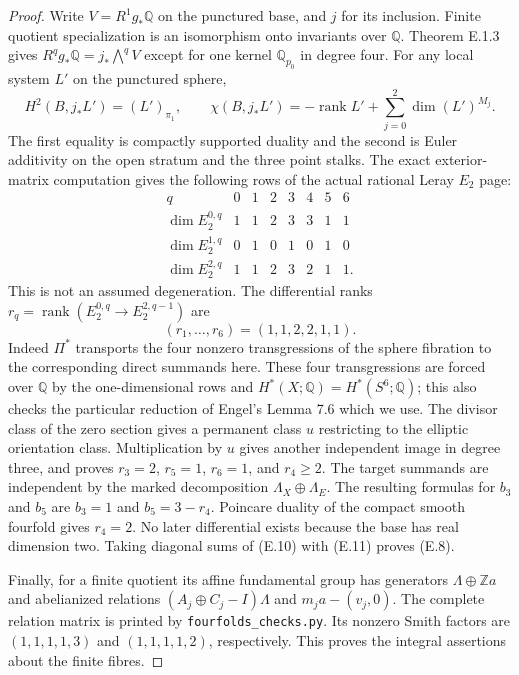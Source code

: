\begin{proof}
Write $V=R^1g_*\mathbb Q$ on the punctured base, and $j$ for its
inclusion.  Finite quotient specialization is an isomorphism onto
invariants over $\mathbb Q$.  Theorem E.1.3 gives
$R^qg_*\mathbb Q=j_*\bigwedge^qV$ except for one kernel
$\mathbb Q_{p_0}$ in degree four.  For any local system $L'$ on
the punctured sphere,
\[
 H^2(B,j_*L')=(L')_{\pi_1},\qquad
 \chi(B,j_*L')=-\operatorname{rank}L'+
       \sum_{j=0}^2\dim (L')^{M_j}.
 \tag{E.9}
\]
The first equality is compactly supported duality and the second is
Euler additivity on the open stratum and the three point stalks.
The exact exterior-matrix computation gives the following rows of
the actual rational Leray $E_2$ page:
\[
\begin{array}{c|rrrrrrr}
q&0&1&2&3&4&5&6\\ \hline
\dim E_2^{0,q}&1&1&2&3&3&1&1\\
\dim E_2^{1,q}&0&1&0&1&0&1&0\\
\dim E_2^{2,q}&1&1&2&3&2&1&1.
\end{array}
\tag{E.10}
\]
This is not an assumed degeneration.  The differential ranks
$r_q=\operatorname{rank}(E_2^{0,q}\to E_2^{2,q-1})$ are
\[
 (r_1,\ldots,r_6)=(1,1,2,2,1,1).
 \tag{E.11}
\]
Indeed $\Pi^*$ transports the four nonzero transgressions of the
sphere fibration to the corresponding direct summands here.
These four transgressions are forced over $\mathbb Q$ by the
one-dimensional rows and $H^*(X;\mathbb Q)=H^*(S^6;\mathbb Q)$;
this also checks the particular reduction of Engel's Lemma 7.6
which we use.  The divisor class of the zero section gives a
permanent class $u$ restricting to the elliptic orientation class.
Multiplication by $u$ gives another independent image in degree
three, and proves $r_3=2$, $r_5=1$, $r_6=1$, and $r_4\geq2$.
The target summands are independent by the marked decomposition
$\Lambda_X\oplus\Lambda_E$.  The resulting formulas for $b_3$
and $b_5$ are $b_3=1$ and $b_5=3-r_4$.  Poincare duality of
the compact smooth fourfold gives $r_4=2$.  No later differential
exists because the base has real dimension two.  Taking diagonal
sums of (E.10) with (E.11) proves (E.8).

Finally, for a finite quotient its affine fundamental group has
generators $\Lambda\oplus\mathbb Z a$ and abelianized relations
$(A_j\oplus C_j-I)\Lambda$ and $m_ja-(v_j,0)$.  The complete
relation matrix is printed by \texttt{fourfolds\_checks.py}.
Its nonzero Smith factors are $(1,1,1,1,3)$ and
$(1,1,1,1,2)$, respectively.  This proves the integral assertions
about the finite fibres.
\end{proof}

